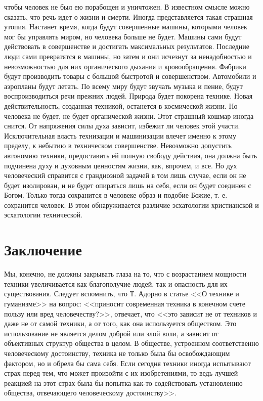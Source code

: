 чтобы человек не был ею порабощен и уничтожен. В известном смысле можно 
сказать, что речь идет о жизни и смерти. Иногда представляется такая страшная 
утопия. Настанет время, когда будут совершенные машины, которыми человек мог 
бы управлять миром, но человека больше не будет. Машины сами будут 
действовать в совершенстве и достигать максимальных результатов. Последние 
люди сами превратятся в машины, но затем и они исчезнут за ненадобностью и 
невозможностью для них органического дыхания и кровообращения. Фабрики будут 
производить товары с большой быстротой и совершенством. Автомобили и аэропланы 
будут летать. По всему миру будут звучать музыка и пение, будут 
воспроизводиться речи прежних людей. Природа будет покорена технике. Новая 
действительность, созданная техникой, останется в космической жизни. Но 
человека не будет, не будет органической жизни. Этот страшный кошмар иногда 
снится. От напряжения силы духа зависит, избежит ли человек этой участи. 
Исключительная власть технизации и машинизации влечет именно к этому пределу, 
к небытию в техническом совершенстве. Невозможно допустить автономию техники, 
предоставить ей полную свободу действия, она должна быть подчинена духу и 
духовным ценностям жизни, как, впрочем, и все. Но дух человеческий справится с 
грандиозной задачей в том  лишь случае, если он не будет изолирован, и не 
будет опираться лишь на себя, если он будет соединен с Богом. Только тогда 
сохранится в человеке образ и подобие Божие, т. е. сохранится человек. В этом 
обнаруживается различие эсхатологии христианской и эсхатологии технической. 
\cite{bib:01}

\newpage

\section{Заключение}

Мы, конечно, не должны закрывать глаза на то, что с возрастанием мощности 
техники увеличивается как благополучие людей, так и опасность для их 
существования. Следует вспомнить, что Т. Адорно в статье <<О технике и 
гуманизме>> на вопрос: <<приносит современная техника в конечном счете пользу 
или вред человечеству?>>, отвечает, что <<это зависит не от техников и даже не 
от самой техники, а от того, как она используется обществом. Это использование 
не является делом доброй или злой воли, а зависит от объективных структур 
общества в целом. В обществе, устроенном соответственно человеческому 
достоинству, техника не только была бы освобождающим фактором, но и обрела бы 
сама себя. Если сегодня техники иногда испытывают страх перед тем, что может 
произойти с их изобретениями, то ведь лучшей реакцией на этот страх была бы 
попытка как-то содействовать установлению общества, отвечающего человеческому 
достоинству>>.

